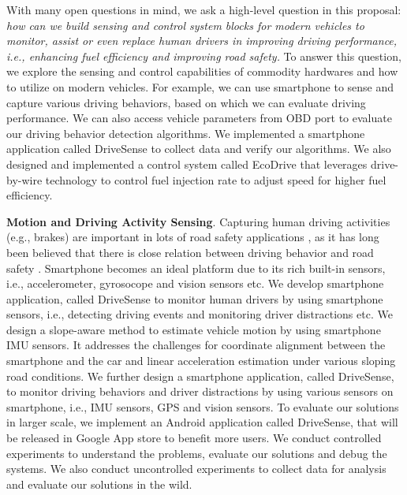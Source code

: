 With many open questions in mind, we ask a high-level question in this proposal: 
\emph{how can we build sensing and control system blocks for modern vehicles to
monitor, assist or even replace human drivers in
improving driving performance, i.e., enhancing fuel efficiency and improving road safety.}
To answer this question, we explore the sensing and control capabilities
of commodity hardwares and how to utilize on modern vehicles. 
For example, we can use smartphone to sense and capture 
various driving behaviors, 
based on which we can evaluate driving performance. 
We can also access vehicle parameters from OBD 
port \cite{obd} to evaluate our driving behavior detection algorithms. 
We implemented a smartphone application called DriveSense to collect
data and verify our algorithms. 
We also designed and implemented a control system called EcoDrive that 
leverages drive-by-wire technology to control fuel injection
rate to adjust speed for higher fuel efficiency. 



\textbf{Motion and Driving Activity Sensing}. 
Capturing human driving activities (e.g., brakes) are important
in lots of road safety applications \cite{uber}, 
as it has long been believed that there is close relation
between driving behavior and road safety \cite{progressive}.
Smartphone becomes an ideal platform due to its rich built-in
sensors, i.e., accelerometer, gyrosocope and vision sensors etc. 
We develop smartphone application, called DriveSense 
to monitor human drivers by using smartphone sensors, 
i.e., detecting driving events and monitoring driver distractions etc. 
We design a slope-aware method to estimate vehicle motion by using
smartphone IMU sensors. 
It addresses the challenges for coordinate alignment between the smartphone 
and the car and linear acceleration estimation under various sloping road conditions.
We further design a smartphone application, called DriveSense, 
to monitor driving behaviors and driver distractions by using various sensors on smartphone, 
i.e., IMU sensors, GPS and vision sensors. 
To evaluate our solutions in larger scale, we implement an Android
application called DriveSense, that will be released in Google
App store to benefit more users. 
We conduct controlled experiments to understand the problems, 
evaluate our solutions and debug the systems. 
We also conduct uncontrolled experiments to collect data
for analysis and evaluate our solutions in the wild. 




